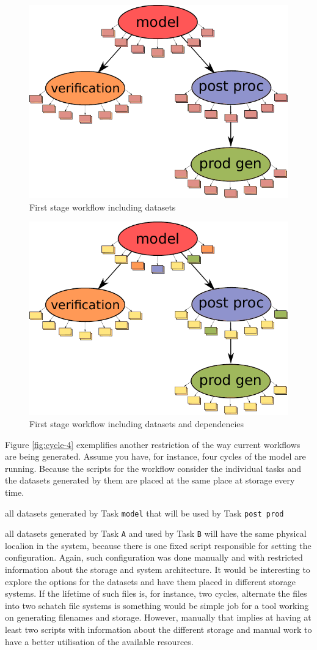 \documentclass[a4paper]{article}
\begin{document}
\begin{figure}[H]
  \centering
  \includegraphics[width=0.6\columnwidth]{cycle-io}
  \caption{First stage workflow including datasets}
  \label{fig:cycle-io}
\end{figure}

\begin{figure}[H]
  \centering
  \includegraphics[width=0.6\columnwidth]{cycle-io-dep}
  \caption{First stage workflow including datasets and dependencies}
  \label{fig:cycle-io-dep}
\end{figure}

Figure \ref{fig:cycle-4} exemplifies another restriction of the way current workflows are being generated. Assume you have, for instance, four cycles of the model are running. Because the scripts for the workflow consider the individual tasks and the datasets generated by them are placed at the same place at storage every time.

all datasets generated by Task \texttt{model} that will be used by Task \texttt{post prod}

all datasets generated by Task \texttt{A} and used by Task \texttt{B} will have the same physical localion in the system, because there is one fixed script responsible for setting the configuration. Again, such configuration was done manually and with restricted information about the storage and system architecture. It would be interesting to explore the options for the datasets and have them placed in different storage systems. If the lifetime of such files is, for instance, two cycles, alternate the files into two schatch file systems is something would be simple job for a tool working on generating filenames and storage. However, manually that implies at having at least two scripts with information about the different storage and manual work to have a better utilisation of the available resources.
\end{document}
